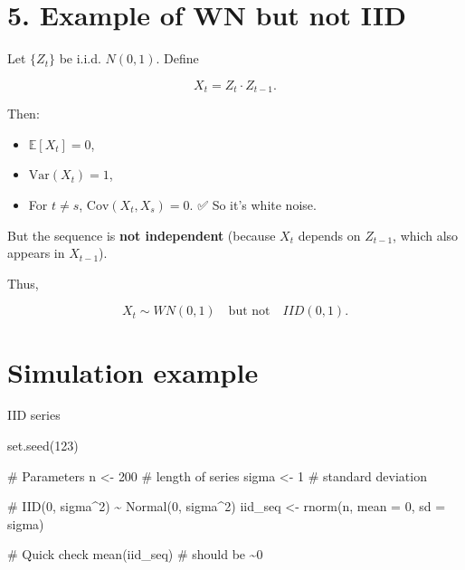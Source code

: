 \documentclass[
  11pt,
  a4paper,
]{report}
\newenvironment{Shaded}{\begin{snugshade}}{\end{snugshade}}
\newcommand{\AttributeTok}[1]{\textcolor[rgb]{0.40,0.45,0.13}{#1}}
\newcommand{\CommentTok}[1]{\textcolor[rgb]{0.37,0.37,0.37}{#1}}
\newcommand{\DecValTok}[1]{\textcolor[rgb]{0.68,0.00,0.00}{#1}}
\newcommand{\FunctionTok}[1]{\textcolor[rgb]{0.28,0.35,0.67}{#1}}
\newcommand{\NormalTok}[1]{\textcolor[rgb]{0.00,0.23,0.31}{#1}}
\newcommand{\OtherTok}[1]{\textcolor[rgb]{0.00,0.23,0.31}{#1}}
\providecommand{\tightlist}{%
  \setlength{\itemsep}{0pt}\setlength{\parskip}{0pt}}\usepackage{longtable,booktabs,array}
\begin{document}
\section{5. Example of WN but not IID}\label{example-of-wn-but-not-iid}

Let \(\{Z_t\}\) be i.i.d. \(N(0,1)\). Define

\[
X_t = Z_t \cdot Z_{t-1}.
\]

Then:

\begin{itemize}
\tightlist
\item
  \(\mathbb{E}[X_t] = 0\),\\
\item
  \(\mathrm{Var}(X_t) = 1\),\\
\item
  For \(t \neq s\), \(\mathrm{Cov}(X_t, X_s) = 0\). ✅ So it's white
  noise.
\end{itemize}

But the sequence is \textbf{not independent} (because \(X_t\) depends on
\(Z_{t-1}\), which also appears in \(X_{t-1}\)).

Thus,

\[
X_t \sim WN(0,1) \quad \text{but not} \quad IID(0,1).
\]

\section{Simulation example}\label{simulation-example}

IID series

\begin{Shaded}
\begin{Highlighting}[]
\FunctionTok{set.seed}\NormalTok{(}\DecValTok{123}\NormalTok{)}

\CommentTok{\# Parameters}
\NormalTok{n }\OtherTok{\textless{}{-}} \DecValTok{200}        \CommentTok{\# length of series}
\NormalTok{sigma }\OtherTok{\textless{}{-}} \DecValTok{1}      \CommentTok{\# standard deviation}

\CommentTok{\# IID(0, sigma\^{}2) \textasciitilde{} Normal(0, sigma\^{}2)}
\NormalTok{iid\_seq }\OtherTok{\textless{}{-}} \FunctionTok{rnorm}\NormalTok{(n, }\AttributeTok{mean =} \DecValTok{0}\NormalTok{, }\AttributeTok{sd =}\NormalTok{ sigma)}

\CommentTok{\# Quick check}
\FunctionTok{mean}\NormalTok{(iid\_seq)      }\CommentTok{\# should be \textasciitilde{}0}
\end{Highlighting}
\end{Shaded}
\end{document}
